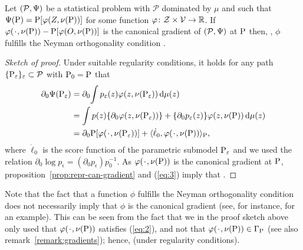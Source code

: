 \documentclass[a4,danish]{article}
\begin{document}
\begin{proposition}
  \label{prop:eif-no}
  Let $(\mathcal{P}, \TT)$ be a statistical problem with $\mathcal{P}$ dominated by $\mu$ and such
  that $\TT(\P) = \P[\phi(Z, \nu(\P))]$ for some function
  $\phi\colon \mathcal{Z} \times \mathcal{V} \rightarrow \R$. If
  $\phi(\blank, \nu(\P)) - \P[\phi(O, \nu(\P))]$ is the canonical gradient of $(\mathcal{P}, \TT)$
  at $\P$ then, , $\phi$ fulfills
  the Neyman orthogonality condition .
\end{proposition}

\begin{proof}[Sketch of proof]
  Under suitable regularity conditions, it holds for any  path
  $\{\P_{\epsilon}\}_{\epsilon} \subset \mathcal{P}$ with $\P_0=\P$ that
  \begin{align}
    \label{eq:3}
    \begin{split}
      \partial_0{ \TT(\P_{\epsilon})}%
      & =\partial_0{ \int p_{\epsilon}(z) \phi(z, \nu(\P_{\epsilon})) \diff \mu(z)} \\
      & = \int p(z) \{\partial_0{ \phi(z, \nu(\P_{\epsilon}))}\} +  \{\partial_0{p_{\epsilon}(z)}\} \phi(z, \nu(\P)) \diff \mu(z) \\
      & = \partial_0{\P[ \phi(\blank, \nu(\P_{\epsilon}))]} +
      \langle \dot{\ell}_0, \phi(\blank, \nu(\P))\rangle_{\P},
    \end{split}
  \end{align}
  where $\dot{\ell}_0$ is the score function of the parametric submodel $\P_{\epsilon}$ and we used
  the relation $\partial_0{\log p_{\epsilon}} = (\partial_0{p_{\epsilon}})p_0^{-1}$. As
  $\phi(\blank, \nu(\P))$ is the canonical gradient at $\P$,
  proposition~\ref{prop:repr-can-gradient} and (\ref{eq:3}) imply that .
\end{proof}

\begin{remark}
  Note that the fact that a function $\phi$ fulfills the Neyman orthogonality condition does not
  necessarily imply that $\phi$ is the canonical gradient (see, for instance,
  \cite{chernozhukov2016double} for an example). This can be seen from the fact that we in the proof
  sketch above only used that $\phi(\blank, \nu(\P))$ satisfies (\ref{eq:2}), and not that
  $\phi(\blank, \nu(\P)) \in \Gamma_{\P}$ (see also remark~\ref{remark:gradients}); hence,
   (under regularity conditions).
\end{remark}
\end{document}
